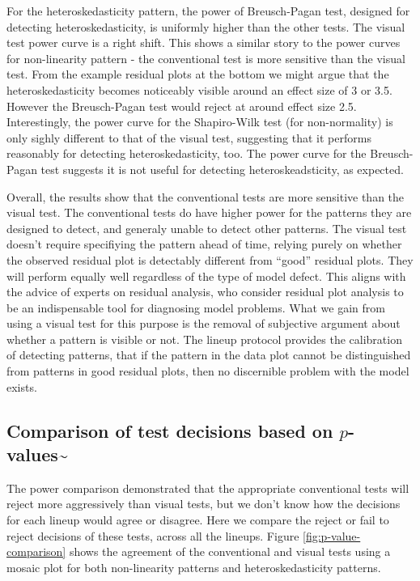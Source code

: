 \documentclass[]{interact}
\theoremstyle{plain}%
\theoremstyle{definition}
\theoremstyle{remark}
\begin{document}
For the heteroskedasticity pattern, the power of Breusch-Pagan test,
designed for detecting heteroskedasticity, is uniformly higher than the
other tests. The visual test power curve is a right shift. This shows a
similar story to the power curves for non-linearity pattern - the
conventional test is more sensitive than the visual test. From the
example residual plots at the bottom we might argue that the
heteroskedasticity becomes noticeably visible around an effect size of 3
or 3.5. However the Breusch-Pagan test would reject at around effect
size 2.5. Interestingly, the power curve for the Shapiro-Wilk test (for
non-normality) is only sighly different to that of the visual test,
suggesting that it performs reasonably for detecting heteroskedasticity,
too. The power curve for the Breusch-Pagan test suggests it is not
useful for detecting heteroskeadsticity, as expected.

Overall, the results show that the conventional tests are more sensitive
than the visual test. The conventional tests do have higher power for
the patterns they are designed to detect, and generaly unable to detect
other patterns. The visual test doesn't require specifiying the pattern
ahead of time, relying purely on whether the observed residual plot is
detectably different from ``good'' residual plots. They will perform
equally well regardless of the type of model defect. This aligns with
the advice of experts on residual analysis, who consider residual plot
analysis to be an indispensable tool for diagnosing model problems. What
we gain from using a visual test for this purpose is the removal of
subjective argument about whether a pattern is visible or not. The
lineup protocol provides the calibration of detecting patterns, that if
the pattern in the data plot cannot be distinguished from patterns in
good residual plots, then no discernible problem with the model exists.

\hypertarget{comparison-of-test-decisions-based-on-p-values}{%
\subsection{\texorpdfstring{Comparison of test decisions based on
\(p\)-values\textasciitilde{}\label{p-value}}{Comparison of test decisions based on p-values\textasciitilde{}}}\label{comparison-of-test-decisions-based-on-p-values}}

The power comparison demonstrated that the appropriate conventional
tests will reject more aggressively than visual tests, but we don't know
how the decisions for each lineup would agree or disagree. Here we
compare the reject or fail to reject decisions of these tests, across
all the lineups. Figure \ref{fig:p-value-comparison} shows the agreement
of the conventional and visual tests using a mosaic plot for both
non-linearity patterns and heteroskedasticity patterns.
\end{document}

